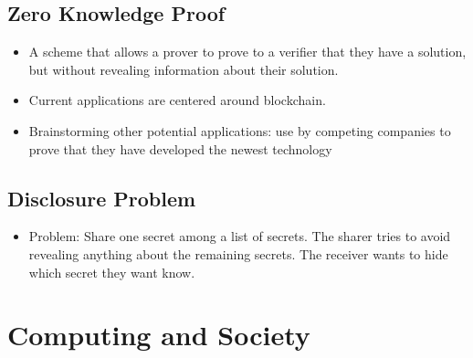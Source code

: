 \documentclass{article}
\begin{document}
\subsection{Zero Knowledge Proof}
    \begin{itemize}
        \item A scheme that allows a prover to prove to a verifier that they have a solution, but without revealing information about their solution. \cite{intro_zkp}
        \item Current applications are centered around blockchain. \cite{zkp_application_blockchain}
        \item Brainstorming other potential applications: use by competing companies to prove that they have developed the newest technology
    \end{itemize}

\subsection{Disclosure Problem} \cite{disclosure_prob}
    \begin{itemize}
        \item Problem: Share one secret among a list of secrets. The sharer tries to avoid revealing anything about the remaining secrets. The receiver wants to hide which secret they want know.
    \end{itemize}

\section{Computing and Society}

\printbibliography
\end{document}
